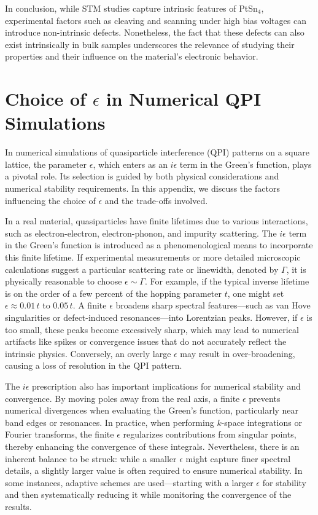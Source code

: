 In conclusion, while STM studies capture intrinsic features of PtSn$_4$, experimental factors such as cleaving and scanning under high bias voltages can introduce non-intrinsic defects. Nonetheless, the fact that these defects can also exist intrinsically in bulk samples underscores the relevance of studying their properties and their influence on the material’s electronic behavior.


\chapter{Choice of $\epsilon$ in Numerical QPI Simulations} \label{app:epsilon}

In numerical simulations of quasiparticle interference (QPI) patterns on a square lattice, the parameter $\epsilon$, which enters as an $i\epsilon$ term in the Green's function, plays a pivotal role. Its selection is guided by both physical considerations and numerical stability requirements. In this appendix, we discuss the factors influencing the choice of $\epsilon$ and the trade-offs involved.

In a real material, quasiparticles have finite lifetimes due to various interactions, such as electron-electron, electron-phonon, and impurity scattering. The $i\epsilon$ term in the Green’s function is introduced as a phenomenological means to incorporate this finite lifetime. If experimental measurements or more detailed microscopic calculations suggest a particular scattering rate or linewidth, denoted by $\Gamma$, it is physically reasonable to choose $\epsilon \sim \Gamma$. For example, if the typical inverse lifetime is on the order of a few percent of the hopping parameter $t$, one might set $\epsilon \approx 0.01\,t$ to $0.05\,t$. A finite $\epsilon$ broadens sharp spectral features—such as van Hove singularities or defect-induced resonances—into Lorentzian peaks. However, if $\epsilon$ is too small, these peaks become excessively sharp, which may lead to numerical artifacts like spikes or convergence issues that do not accurately reflect the intrinsic physics. Conversely, an overly large $\epsilon$ may result in over-broadening, causing a loss of resolution in the QPI pattern.

The $i\epsilon$ prescription also has important implications for numerical stability and convergence. By moving poles away from the real axis, a finite $\epsilon$ prevents numerical divergences when evaluating the Green's function, particularly near band edges or resonances. In practice, when performing $k$-space integrations or Fourier transforms, the finite $\epsilon$ regularizes contributions from singular points, thereby enhancing the convergence of these integrals. Nevertheless, there is an inherent balance to be struck: while a smaller $\epsilon$ might capture finer spectral details, a slightly larger value is often required to ensure numerical stability. In some instances, adaptive schemes are used—starting with a larger $\epsilon$ for stability and then systematically reducing it while monitoring the convergence of the results.

